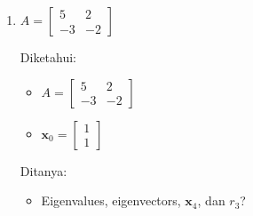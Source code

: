 \documentclass[12pt, a4paper]{scrartcl}
\begin{document}
\begin{enumerate}
\begin{enumerate}
                \pagebreak

                \item $A=\begin{bmatrix}
                    5&2\\-3&-2
                \end{bmatrix}$

                Diketahui:
                \begin{itemize}
                    \item[] $A=\begin{bmatrix}
                        5&2\\-3&-2
                    \end{bmatrix}$
                    \item[] $\textbf{x}_0=\begin{bmatrix}
                        1\\1
                    \end{bmatrix}$
                \end{itemize}

                Ditanya:
                \begin{itemize}
                    \item Eigenvalues, eigenvectors, $\textbf{x}_4$, dan $r_3$?
                \end{itemize}


\end{enumerate}
\end{enumerate}
\end{document}
